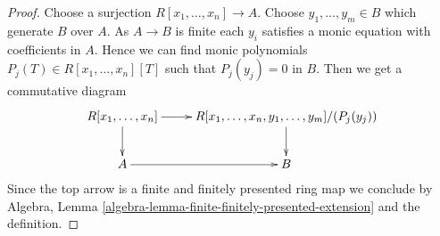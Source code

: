 \documentclass[10pt,a4paper]{amsart}
\theoremstyle{plain}
\theoremstyle{definition}
\theoremstyle{remark}
\numberwithin{equation}{subsection}
\begin{document}
\begin{proof}
Choose a surjection $R[x_1, \ldots, x_n] \to A$.
Choose $y_1, \ldots, y_m \in B$ which generate $B$ over $A$.
As $A \to B$ is finite each $y_i$ satisfies a monic equation with
coefficients in $A$. Hence we can find monic polynomials
$P_j(T) \in R[x_1, \ldots, x_n][T]$ such that $P_j(y_j) = 0$ in $B$.
Then we get a commutative diagram
$$
\xymatrix{
R[x_1, \ldots, x_n] \ar[d] \ar[r] &
R[x_1, \ldots, x_n, y_1, \ldots, y_m]/(P_j(y_j)) \ar[d] \\
A \ar[r] & B
}
$$
Since the top arrow is a finite and finitely presented ring map
we conclude by
Algebra, Lemma \ref{algebra-lemma-finite-finitely-presented-extension}
and the definition.
\end{proof}
\end{document}
